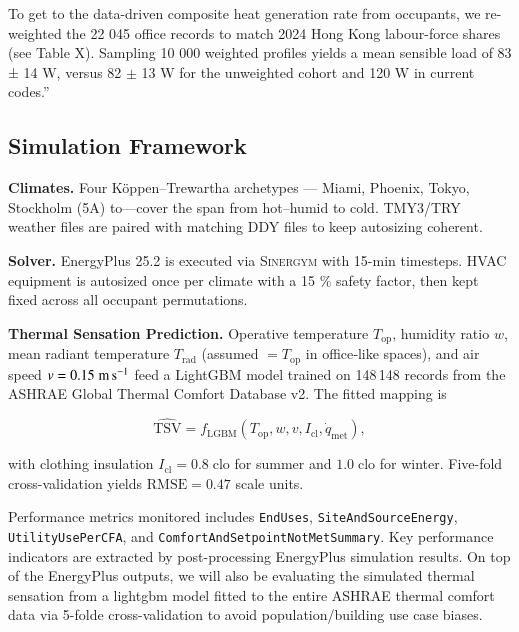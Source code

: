 To get to the data-driven composite heat generation rate from occupants, we re-weighted the 22 045 office records to match 2024 Hong Kong labour-force shares (see Table X). Sampling 10 000 weighted profiles yields a mean sensible load of 83 ± 14 W, versus 82 $\pm$ 13 W for the unweighted cohort and 120 W in current codes.”

\subsection{Simulation Framework}\label{sec:framework}

\textbf{Climates.}  Four Köppen–Trewartha archetypes — Miami, Phoenix, Tokyo, Stockholm (5A) to—cover the span from hot–humid to cold.  
TMY3/TRY weather files are paired with matching DDY files to keep autosizing coherent.

\textbf{Solver.}  EnergyPlus 25.2 is executed via \textsc{Sinergym} with 15-min timesteps.  
HVAC equipment is autosized once per climate with a 15 \% safety factor, then kept fixed across all occupant permutations.

\textbf{Thermal Sensation Prediction.}  
Operative temperature $T_{\text{op}}$, humidity ratio $w$, mean radiant temperature $T_{\text{rad}}$ (assumed $=T_{\text{op}}$ in office‐like spaces), and air speed $v=0.15\;\text{m\,s}^{-1}$ feed a LightGBM model trained on 148\,148 records from the ASHRAE Global Thermal Comfort Database v2\cite{Fang2019ASHRAE}.  
The fitted mapping is

\begin{equation}
\widehat{\text{TSV}} = f_{\text{LGBM}}\!\left(T_{\text{op}},w,v,I_{\text{cl}},\dot{q}_{\text{met}}\right),
\end{equation}

with clothing insulation $I_{\text{cl}}=0.8\;\text{clo}$ for summer and $1.0\;\text{clo}$ for winter.  Five-fold cross-validation yields $\mathrm{RMSE}=0.47$ scale units.


Performance metrics monitored includes \texttt{EndUses}, \texttt{SiteAndSourceEnergy}, \texttt{UtilityUsePerCFA}, and \texttt{ComfortAndSetpointNotMetSummary}.  
Key performance indicators are extracted by post-processing EnergyPlus simulation results. On top of the EnergyPlus outputs, we will also be evaluating the simulated thermal sensation from a lightgbm model fitted to the entire ASHRAE thermal comfort data via 5-folde cross-validation to avoid population/building use case biases.

